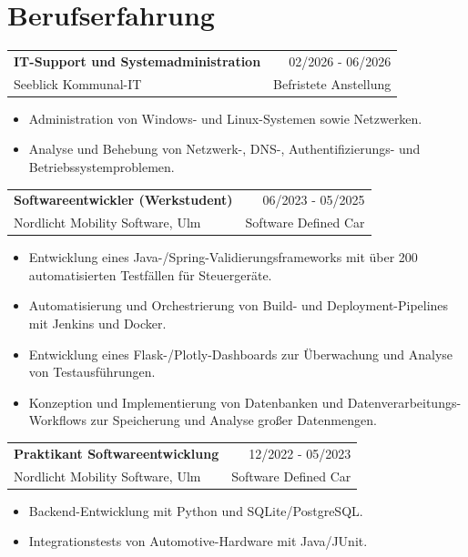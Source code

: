 \documentclass[10pt,a4paper]{article}
\makeatletter
\newcommand{\entry}[4]{%
  \begin{tabular*}{\linewidth}{@{}l@{\extracolsep{\fill}}r@{}}
    \textbf{#1} & {\small\color{grey}#2}\\
    {\small #3} & {\small\color{grey}#4}
  \end{tabular*}\par\nopagebreak[4]}
\makeatother
\begin{document}
\section{Berufserfahrung}
\entry{IT-Support und Systemadministration}{02/2026 - 06/2026}{Seeblick Kommunal-IT}{Befristete Anstellung}
\begin{itemize}
  \item Administration von Windows- und Linux-Systemen sowie Netzwerken.
  \item Analyse und Behebung von Netzwerk-, DNS-, Authentifizierungs- und Betriebssystemproblemen.
\end{itemize}
\vspace{4pt}
\entry{Softwareentwickler (Werkstudent)}{06/2023 - 05/2025}{Nordlicht Mobility Software, Ulm}{Software Defined Car}
\begin{itemize}
  \item Entwicklung eines Java-/Spring-Validierungsframeworks mit über 200 automatisierten Testfällen für Steuergeräte.
  \item Automatisierung und Orchestrierung von Build- und Deployment-Pipelines mit Jenkins und Docker.
  \item Entwicklung eines Flask-/Plotly-Dashboards zur Überwachung und Analyse von Testausführungen.
  \item Konzeption und Implementierung von Datenbanken und Datenverarbeitungs-Workflows zur Speicherung und Analyse großer Datenmengen.
\end{itemize}
\vspace{4pt}
\entry{Praktikant Softwareentwicklung}{12/2022 - 05/2023}{Nordlicht Mobility Software, Ulm}{Software Defined Car}
\begin{itemize}
  \item Backend-Entwicklung mit Python und SQLite/PostgreSQL.
  \item Integrationstests von Automotive-Hardware mit Java/JUnit.
\end{itemize}
\end{document}
